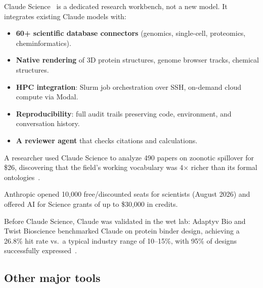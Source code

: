 \documentclass[11pt,a4paper]{article}
\begin{document}
Claude Science~\cite{claudescience2026} is a dedicated research workbench, not a new model. It integrates existing Claude models with:

\begin{itemize}
\item \textbf{60+ scientific database connectors} (genomics, single-cell, proteomics, cheminformatics).
\item \textbf{Native rendering} of 3D protein structures, genome browser tracks, chemical structures.
\item \textbf{HPC integration}: Slurm job orchestration over SSH, on-demand cloud compute via Modal.
\item \textbf{Reproducibility}: full audit trails preserving code, environment, and conversation history.
\item \textbf{A reviewer agent} that checks citations and calculations.
\end{itemize}

A researcher used Claude Science to analyze 490 papers on zoonotic spillover for \$26, discovering that the field's working vocabulary was 4$\times$ richer than its formal ontologies~\cite{drakeforbes2026}.

Anthropic opened 10,000 free/discounted seats for scientists (August 2026) and offered AI for Science grants of up to \$30,000 in credits.

Before Claude Science, Claude was validated in the wet lab: Adaptyv Bio and Twist Bioscience benchmarked Claude on protein binder design, achieving a 26.8\% hit rate vs.\ a typical industry range of 10--15\%, with 95\% of designs successfully expressed~\cite{adaptyvbio2026}.

\subsection{Other major tools}
\end{document}
